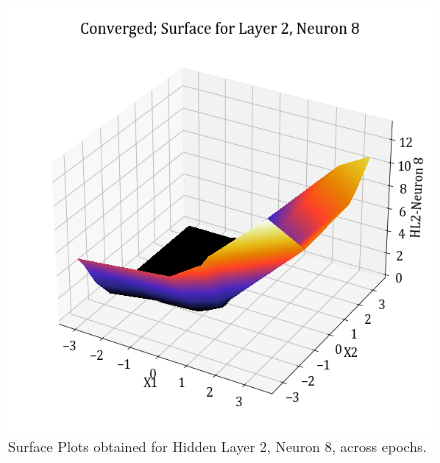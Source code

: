\documentclass[11pt,a4paper]{article}
\begin{document}
\begin{figure}[H]
    \includegraphics[scale=0.4]{images/1B_MLFFNN_conv_HL2_N8.png}
    \caption{Surface Plots obtained for Hidden Layer 2, Neuron 8, across epochs.}
\end{figure}
\end{document}
